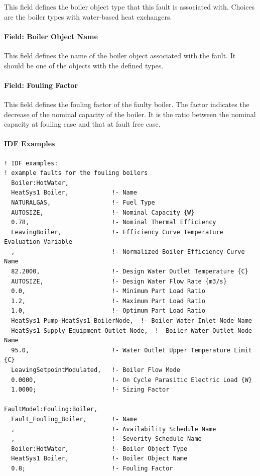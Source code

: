 This field defines the boiler object type that this fault is associated with. Choices are the boiler types with water-based heat exchangers.

\paragraph{Field: Boiler Object Name}\label{field-boiler-object-name}

This field defines the name of the boiler object associated with the fault. It should be one of the objects with the defined types.

\paragraph{Field: Fouling Factor}

This field defines the fouling factor of the faulty boiler. The factor indicates the decrease of the nominal capacity of the boiler. It is the ratio between the nominal capacity at fouling case and that at fault free case.

\paragraph{IDF Examples}

\begin{lstlisting}
! IDF examples:
! example faults for the fouling boilers
  Boiler:HotWater,
  HeatSys1 Boiler,            !- Name
  NATURALGAS,                 !- Fuel Type
  AUTOSIZE,                   !- Nominal Capacity {W}
  0.78,                       !- Nominal Thermal Efficiency
  LeavingBoiler,              !- Efficiency Curve Temperature Evaluation Variable
  ,                           !- Normalized Boiler Efficiency Curve Name
  82.2000,                    !- Design Water Outlet Temperature {C}
  AUTOSIZE,                   !- Design Water Flow Rate {m3/s}
  0.0,                        !- Minimum Part Load Ratio
  1.2,                        !- Maximum Part Load Ratio
  1.0,                        !- Optimum Part Load Ratio
  HeatSys1 Pump-HeatSys1 BoilerNode,  !- Boiler Water Inlet Node Name
  HeatSys1 Supply Equipment Outlet Node,  !- Boiler Water Outlet Node Name
  95.0,                       !- Water Outlet Upper Temperature Limit {C}
  LeavingSetpointModulated,   !- Boiler Flow Mode
  0.0000,                     !- On Cycle Parasitic Electric Load {W}
  1.0000;                     !- Sizing Factor

FaultModel:Fouling:Boiler,
  Fault_Fouling_Boiler,       !- Name
  ,                           !- Availability Schedule Name
  ,                           !- Severity Schedule Name
  Boiler:HotWater,            !- Boiler Object Type
  HeatSys1 Boiler,            !- Boiler Object Name
  0.8;                        !- Fouling Factor
\end{lstlisting}


